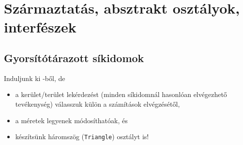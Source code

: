 \documentclass[usenames,dvipsnames,aspectratio=169]{beamer}
\begin{document}
\begin{frame}
    \begin{exampleblock}{}
        \small
        
    \end{exampleblock}
\end{frame}

\section{Származtatás, absztrakt osztályok, interfészek}

\subsection{Gyorsítótárazott síkidomok}

\begin{frame}
    Induljunk ki -ből, de 
    \begin{itemize}
        \item a kerület/terület lekérdezést (minden síkidomnál hasonlóan elvégezhető tevékenység) válasszuk külön a számítások elvégzésétől,
        \item a méretek legyenek módosíthatóak, és
        \item készítsünk háromszög (\texttt{Triangle}) osztályt is!
    \end{itemize}
\end{frame}    
     
\begin{frame}
    \begin{columns}[T]
            \begin{exampleblock}{}
                \scriptsize
                
            \end{exampleblock}
            \begin{exampleblock}{}
                \scriptsize
                
            \end{exampleblock}
    \end{columns}
\end{frame}
\end{document}
